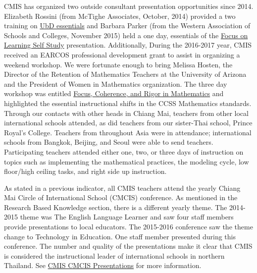 \begin{findings}

CMIS has organized two outside consultant presentation opportunities since 2014. Elizabeth Rossini (from McTighe Associates, October, 2014) provided a two training on \href{https://drive.google.com/drive/folders/0ByVFfrm0zfolbDlqWjhobkhDZkk?usp=sharing}{UbD essentials} and Barbara Parker (from the Western Association of Schools and Colleges, November 2015) held a one day, essentials of the \href{https://docs.google.com/a/cmis.ac.th/document/d/1EMtUkUmaH1t4nhMe6lage73ITakAjX1REvLkAu5Yukg/edit?usp=sharing}{Focus on Learning Self Study} presentation. Additionally, During the 2016-2017 year, CMIS received an EARCOS professional development grant to assist in organizing a weekend workshop. We were fortunate enough to bring Melissa Hosten, the Director of the Retention of  Mathematics Teachers at the University of Arizona and the President of Women in Mathematics organization. The three day workshop was entitled \href{https://drive.google.com/a/cmis.ac.th/file/d/0ByVFfrm0zfolSXFEZFJVN1VOaTQ/view?usp=sharing}{Focus,  Coherence, and Rigor in Mathematics} and highlighted the essential instructional shifts in the CCSS Mathematics standards. Through our contacts with other heads in Chiang Mai, teachers from other local international schools attended, as did teachers from our sister-Thai school, Prince Royal’s College. Teachers from throughout Asia were in attendance; international schools from Bangkok, Beijing, and Seoul were able to send teachers. Participating teachers attended either one, two, or three days of instruction on topics such as implementing the mathematical practices, the modeling cycle, low floor/high ceiling tasks, and right side up instruction. 

 
As stated in a previous indicator, all  CMIS teachers attend the yearly Chiang Mai Circle of International School (CMCIS) conference.  As mentioned in the Research Based Knowledge section, there is a different yearly theme. The 2014-2015 theme was The English Language Learner and saw four staff members provide presentations to local educators. The 2015-2016 conference saw the theme change to Technology in Education. One staff member presented during this conference. The number and quality of the presentations make it clear that CMIS is considered the instructional leader of international schools in northern Thailand. See \href{https://docs.google.com/a/cmis.ac.th/document/d/19oynokmtSbfGSbxQty71a1z3-sd_QGBngaBAVtS0W90/edit?usp=sharing}{CMIS CMCIS Presentations} for more information. 


\end{findings}
